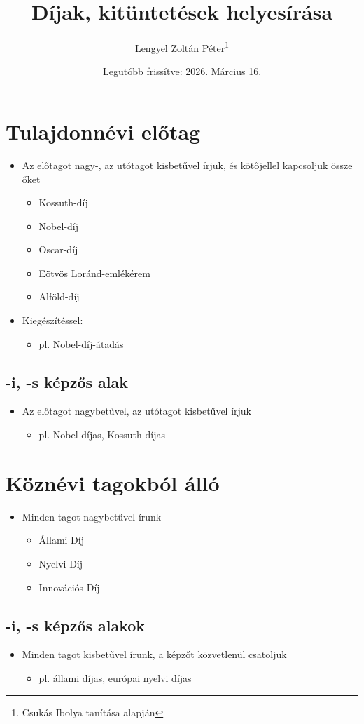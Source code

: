 \documentclass{article}
\title{Díjak, kitüntetések helyesírása}
\author{Lengyel Zoltán Péter\thanks{Csukás Ibolya tanítása alapján}}
\date{Legutóbb frissítve: 2026. Március 16.}
\begin{document}
\maketitle
\tableofcontents
\newpage

\section{Tulajdonnévi előtag}
\begin{itemize}
    \item Az előtagot nagy-, az utótagot kisbetűvel írjuk, és kötőjellel kapcsoljuk össze őket
    \begin{itemize}
        \item Kossuth-díj
        \item Nobel-díj
        \item Oscar-díj
        \item Eötvös Loránd-emlékérem
        \item Alföld-díj
    \end{itemize}

    \item Kiegészítéssel: 
    \begin{itemize}
        \item pl. Nobel-díj-átadás
    \end{itemize}
\end{itemize}

\subsection{-i, -s képzős alak}
\begin{itemize}
    \item Az előtagot nagybetűvel, az utótagot kisbetűvel írjuk \begin{itemize}
        \item pl. Nobel-díjas, Kossuth-díjas
    \end{itemize}
\end{itemize}

\section{Köznévi tagokból álló}
\begin{itemize}
    \item Minden tagot nagybetűvel írunk
    \begin{itemize}
        \item Állami Díj
        \item Nyelvi Díj
        \item Innovációs Díj
    \end{itemize}
\end{itemize}
    \subsection{-i, -s képzős alakok}
    \begin{itemize}
        \item Minden tagot kisbetűvel írunk, a képzőt közvetlenül csatoljuk
        \begin{itemize}
            \item pl. állami díjas, európai nyelvi díjas
        \end{itemize}
    \end{itemize}
\end{document}
